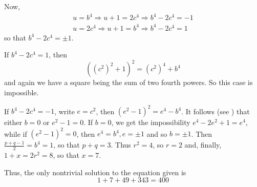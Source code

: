 \documentclass[12pt]{article}
\begin{document}
Now,
\begin{gather*}
u=b^4\Rightarrow u+1=2c^4\Rightarrow b^4-2c^4=-1\\
u=2c^4\Rightarrow u+1=b^4\Rightarrow b^4-2c^4=1
\end{gather*}
so that $b^4-2c^4=\pm 1$.

If $b^4-2c^4=1$, then
\[((c^2)^2+1)^2=(c^2)^4+b^4\]
and again we have a square being the sum of two fourth powers. So this case is impossible.

If $b^4-2c^4=-1$, write $e=c^2$, then $(e^2-1)^2=e^4-b^4$. It follows (see ) that either $b=0$ or $e^2-1=0$. If $b=0$, we get the impossibility $e^4-2e^2+1=e^4$, while if $(e^2-1)^2=0$, then $e^4=b^4, e=\pm 1$ and so $b=\pm 1$. Then $\displaystyle \frac{p+q-1}{2}=b^4=1$, so that $p+q=3$. Thus $r^2=4$, so $r=2$ and, finally, $1+x=2r^2=8$, so that $x=7$.

Thus, the only nontrivial solution to the equation given is
\[1+7+49+343=400\]
\end{document}

